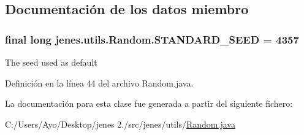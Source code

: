 \subsection{Documentación de los datos miembro}
\hypertarget{classjenes_1_1utils_1_1_random_aee05c4e6476472dc9dc02d2fd94061b5}{
\subsubsection[{S\-T\-A\-N\-D\-A\-R\-D\-\_\-\-S\-E\-E\-D}]{\setlength{\rightskip}{0pt plus 5cm}final long jenes.\-utils.\-Random.\-S\-T\-A\-N\-D\-A\-R\-D\-\_\-\-S\-E\-E\-D = 4357\hspace{0.3cm}{\ttfamily [static]}}}\label{classjenes_1_1utils_1_1_random_aee05c4e6476472dc9dc02d2fd94061b5}
The seed used as default 

Definición en la línea 44 del archivo Random.\-java.



La documentación para esta clase fue generada a partir del siguiente fichero\-:\begin{DoxyCompactItemize}
\item 
C\-:/\-Users/\-Ayo/\-Desktop/jenes 2./src/jenes/utils/\hyperlink{_random_8java}{Random.\-java}\end{DoxyCompactItemize}
